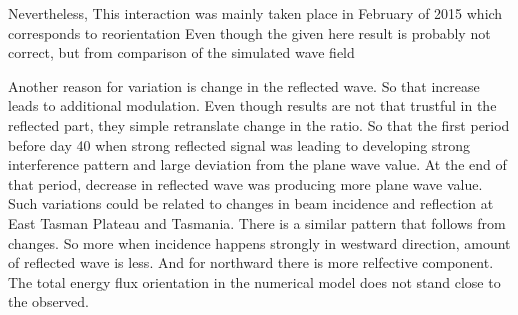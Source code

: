 \documentclass[12pt]{article}
\begin{document}
Nevertheless,  This interaction was mainly taken place in February of 
2015 which corresponds to reorientation 
Even though the given here result is 
probably not correct, but from comparison of the simulated wave field 

Another reason for variation is change in the reflected wave. So that increase 
leads to additional 
modulation. Even though results are not that trustful in the reflected part, they simple 
retranslate change in the ratio. So that the first period before day 40 when strong reflected 
signal was leading to developing strong interference pattern and large deviation from the plane 
wave value. At the end of that period, decrease in reflected wave was producing more plane wave 
value. Such variations could be related to changes in beam incidence and reflection at East Tasman 
Plateau and Tasmania. There is a similar pattern that follows from changes. So more when incidence 
happens strongly in westward direction, amount of reflected wave is less. And for northward there 
is more relfective component. The total energy flux orientation in the numerical model does not 
stand close to the observed.

\end{document}
